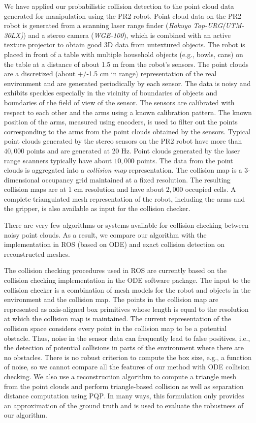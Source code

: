 We have applied our probabilistic collision detection to the point cloud data generated for manipulation using the PR2 robot. Point cloud data on the PR2 robot is generated from a scanning laser range finder (\emph{Hokuyo Top-URG(UTM-30LX)}) and a stereo camera (\emph{WGE-100}), which is combined with an active texture projector to obtain good 3D data from untextured objects. The robot is placed in front of a table with multiple household objects (e.g., bowls, cans) on the table at a distance of about 1.5 m from the robot's sensors. The point clouds are a discretized (about +/-1.5 cm in range) representation of the real environment and are generated periodically by each sensor. The data is noisy and exhibits speckles especially in the vicinity of boundaries of objects and boundaries of the field of view of the sensor. The sensors are calibrated with respect to each other and the arms using a known calibration pattern. The known position of the arms, measured using encoders, is used to filter out the points corresponding to the arms from the point clouds obtained by the sensors. Typical point clouds generated by the stereo sensors on the PR2 robot have more than $40,000$ points and are generated at 20 Hz. Point clouds generated by the laser range scanners typically have about $10,000$ points. The data from the point clouds is aggregated into a {\em collision map} representation. The collision map is a 3-dimensional occupancy grid maintained at a fixed resolution. The resulting collision maps are at 1 cm resolution and have about $2,000$ occupied cells. A complete triangulated mesh representation of the robot, including the arms and the gripper, is also available as input for the collision checker.

There are very few algorithms or systems available for collision checking between noisy point clouds. As a result, we compare our algorithm with the implementation in ROS (based on ODE) and exact collision detection on reconstructed meshes.

The collision checking procedures used in ROS are currently based on the collision checking implementation in the ODE software package. The input to the collision checker is a combination of mesh models for the robot and objects in the environment and the collision map. The points in the collision map are represented as axis-aligned box primitives whose length is equal to the resolution at which the collision map is maintained. The current representation of the collision space considers every point in the collision map to be a potential obstacle. Thus, noise in the sensor data can frequently lead to false positives, i.e., the detection of potential collisions in parts of the environment where there are no obstacles. There is no robust criterion to compute the box size, e.g., a function of noise, so we cannot compare all the features of our method with ODE collision checking. We also use a reconstruction algorithm to compute a triangle mesh from the point clouds and perform triangle-based collision as well as separation distance computation using PQP. In many ways, this formulation only provides an approximation of the ground truth and is used to evaluate the robustness of our algorithm.

